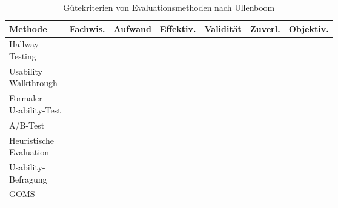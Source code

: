 \begin{table}[h!]
		\begin{tabular}{|l|c|c|c|c|c|c|}
			\hline
			\textbf{Methode}&\textbf{Fachwis.}&\textbf{Aufwand}&\textbf{Effektiv.}&\textbf{Validität}&\textbf{Zuverl.}&\textbf{Objektiv.}\\
			\hline
			\twolinecell{Hallway\\Testing} & \star & \star & \star \star & \star & \star & \star\\
			\hline
			\twolinecell{Usability\\Walkthrough} & \star \star & \star \star & \star \star & \star \star & \star & \star\\
			\hline
			\twolinecell{Formaler\\Usability-Test} & \star \star & \star \star \star & \star \star \star & \star \star \star & \star \star & \star \star\\
			\hline								
			\twolinecell{A/B-Test\\[2.3ex]} & \star \star & \star \star & \star \star & \star \star \star & \star \star & \star \star \star\\
			\hline
			\twolinecell{Heuristische\\Evaluation} & \star \star \star & \star & \star \star \star & \star \star & \star \star \star & \star\\
			\hline
			\twolinecell{Usability-\\Befragung} & \star & \star & \star & \star \star & \star \star & \star \star \star\\
			\hline
			\twolinecell{GOMS\\[2.3ex]} & \star \star & \star \star & \star & \star \star & \star \star \star & \star \star \star\\
			\hline
		\end{tabular}
		\caption{Gütekriterien von Evaluationsmethoden nach Ullenboom \cite[S. 225]{Ullenboom2014}}
	\label{tab:hallwayTesting}
\end{table}
